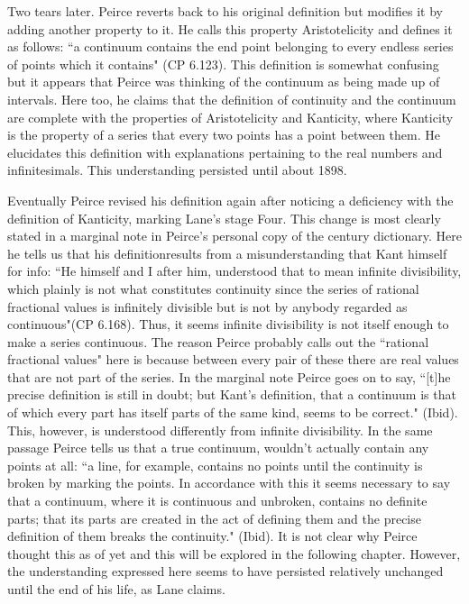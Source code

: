 \documentclass[12pt]{article}
\begin{document}
Two tears later. Peirce reverts back to his original definition but modifies it by adding another property to it. He calls this property Aristotelicity and defines it as follows: ``a continuum contains the end point belonging to every endless series of points which it contains" (CP 6.123). This definition is somewhat confusing but it appears that Peirce was thinking of the continuum as being made up of intervals. Here too, he claims that the definition of continuity and the continuum are complete with the properties of Aristotelicity and Kanticity, where Kanticity is the property of a series that every two points has a point between them. He elucidates this definition with explanations pertaining to the real numbers and infinitesimals. This understanding persisted until about 1898.

Eventually Peirce revised his definition again after noticing a deficiency with the definition of Kanticity, marking Lane's stage Four. This change is most clearly stated in a marginal note in Peirce's personal copy of the century dictionary. Here he tells us that his definitionresults from a misunderstanding that Kant himself for info: ``He himself and I after him, understood that to mean infinite divisibility, which plainly is not what constitutes continuity since the series of rational fractional values is infinitely divisible but is not by anybody regarded as continuous"(CP 6.168). Thus, it seems infinite divisibility is not itself enough to make a series continuous. The reason Peirce probably calls out the ``rational fractional values" here is because between every pair of these there are real values that are not part of the series. In the marginal note Peirce goes on to say, ``[t]he precise definition is still in doubt; but Kant's definition, that a continuum is that of which every part has itself parts of the same kind, seems to be correct." (Ibid). This, however, is understood differently from infinite divisibility. In the same passage Peirce tells us that a true continuum, wouldn't actually contain any points at all: ``a line, for example, contains no points until the continuity is broken by marking the points. In accordance with this it seems necessary to say that a continuum, where it is continuous and unbroken, contains no definite parts; that its parts are created in the act of defining them and the precise definition of them breaks the continuity." (Ibid). It is not clear why Peirce thought this as of yet and this will be explored in the following chapter. However, the understanding expressed here seems to have persisted relatively unchanged until the end of his life, as Lane claims.
\end{document}
